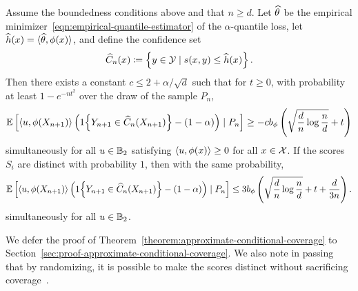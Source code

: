 \documentclass{article}
\newcommand{\radphi}{b_{\phi}}
\newcommand{\scorefunc}{s}
\newcommand{\scoreval}{\scorefunc}
\newcommand{\scorerv}{S}
\begin{document}
\begin{theorem}
  \label{theorem:approximate-conditional-coverage}
  Assume the boundedness conditions above and that $n \ge d$.
  Let $\widehat{\theta}$ be the empirical
  minimizer~\eqref{eqn:empirical-quantile-estimator} of the
  $\alpha$-quantile loss, let $\widehat{h}(x) = \langle\widehat{\theta}, \phi(x)\rangle$,
  and define the confidence set
  \begin{equation*}
    \what{C}_n(x) \defeq \left\{y \in \mc{Y}
    \mid \scoreval(x, y) \le \what{h}(x) \right\}.
  \end{equation*}
  Then there exists a constant
  $c \le 2 + \alpha/\sqrt{d}$ such that for $t \ge 0$,
  with probability at least $1 - e^{-n t^2}$ over the draw
  of the sample $P_n$,
  \begin{equation*}
    \E\left[\<u, \phi(X_{n + 1})\>
      \left(\indic{Y_{n + 1} \in \what{C}_n(X_{n+1})}
      - (1 - \alpha)\right) \mid P_n \right]
    \ge -c \radphi \left(\sqrt{\frac{d}{n}  \log \frac{n}{d}}
    + t \right)
  \end{equation*}
  simultaneously for all $u \in \mathbb{B}_2$
  satisfying $\langle u, \phi(x)\rangle \ge 0$ for all $x \in \mathcal{X}$.
  If the scores $\scorerv_i$ are distinct with probability $1$,
  then with the same probability,
  \begin{equation*}
    \E\left[\<u, \phi(X_{n + 1})\>
      \left(\indic{Y_{n + 1} \in \what{C}_n(X_{n+1})}
      - (1 - \alpha)\right) \mid P_n \right]
    \le 3 \radphi \left(\sqrt{\frac{d}{n} \log \frac{n}{d}}
    + t + \frac{d}{3n} \right).
  \end{equation*}
  simultaneously for all $u \in \mathbb{B}_2$.
\end{theorem}
\noindent
We defer the proof of Theorem~\ref{theorem:approximate-conditional-coverage}
to Section~\ref{sec:proof-approximate-conditional-coverage}.
%
We also note in passing that by randomizing, it is possible to make
the scores distinct without sacrificing coverage~\cite[cf.][]{GibbsChCa23}.
\end{document}
